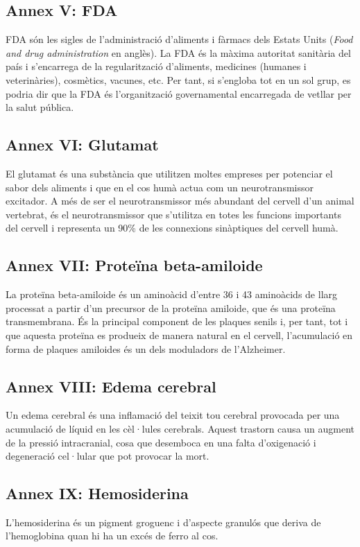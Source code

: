 \documentclass[a4paper,12pt]{article}
\begin{document}
\subsection*{Annex V: FDA}
FDA són les sigles de l'administració d'aliments i fàrmacs dels Estats Units (\textit{Food and drug administration} en anglès). La FDA és la màxima autoritat sanitària del país i s'encarrega de la regularització d'aliments, medicines (humanes i veterinàries), cosmètics, vacunes, etc. Per tant, si s'engloba tot en un sol grup, es podria dir que la FDA és l'organització governamental encarregada de vetllar per la salut pública.
\subsection*{Annex VI: Glutamat}
El glutamat és una substància que utilitzen moltes empreses per potenciar el sabor dels aliments i que en el cos humà actua com un neurotransmissor excitador. A més de ser el neurotransmissor més abundant del cervell d'un animal vertebrat, és el neurotransmissor que s'utilitza en totes les funcions importants del cervell i representa un 90\% de les connexions sinàptiques del cervell humà.
\subsection*{Annex VII: Proteïna beta-amiloide}
La proteïna beta-amiloide és un aminoàcid d'entre 36 i 43 aminoàcids de llarg processat a partir d'un precursor de la proteïna amiloide, que és una proteïna transmembrana. És la principal component de les plaques senils i, per tant, tot i que aquesta proteïna es produeix de manera natural en el cervell, l'acumulació en forma de plaques amiloides és un dels moduladors de l'Alzheimer.
\subsection*{Annex VIII: Edema cerebral}
Un edema cerebral és una inflamació del teixit tou cerebral provocada per una acumulació de líquid en les cèl·lules cerebrals. Aquest trastorn causa un augment de la pressió intracranial, cosa que desemboca en una falta d'oxigenació i degeneració cel·lular que pot provocar la mort.
\subsection*{Annex IX: Hemosiderina}
L'hemosiderina és un pigment groguenc i d'aspecte granulós que deriva de l'hemoglobina quan hi ha un excés de ferro al cos.
\end{document}
